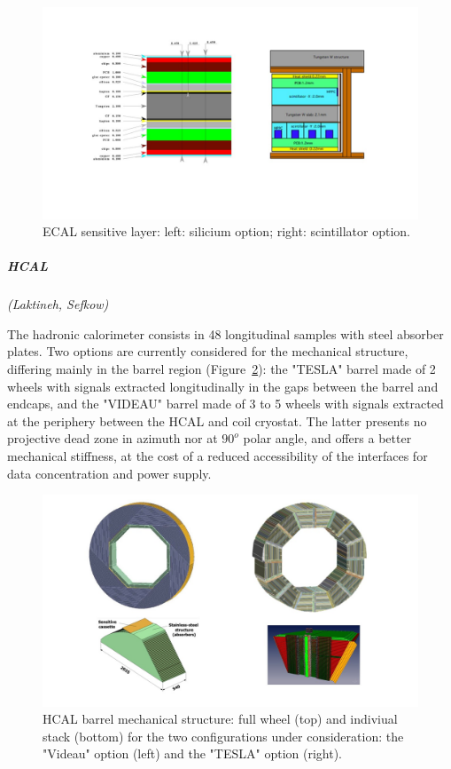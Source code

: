 \begin{figure}[t!]
\centering
\includegraphics[width=1.0\hsize]{Detector/fig/ECAL_readout.jpg}
\caption{ECAL sensitive layer: left: silicium option; right: scintillator option.}
\label{fig:det:ECAL_readout}
\end{figure}


\vspace{1cm}
\subparagraph*{\bf HCAL}
\textit{(Laktineh, Sefkow)}

The hadronic calorimeter consists in 48 longitudinal samples with steel absorber plates. Two options are currently considered for the mechanical structure, differing mainly in the barrel region (Figure~\ref{fig:det:HCAL}): the "TESLA" barrel made of 2 wheels with signals extracted longitudinally in the gaps between the barrel and endcaps, and the "VIDEAU" barrel made of 3 to 5 wheels with signals extracted at the periphery between the HCAL and coil cryostat. The latter presents no projective dead zone in azimuth nor at $90^o$ polar angle, and offers a better mechanical stiffness, at the cost of a reduced accessibility of the interfaces for data concentration and power supply.

\begin{figure}[t!]
\centering
\includegraphics[width=1.1\hsize]{Detector/fig/HCAL_structure.jpg}
\caption{HCAL barrel mechanical structure: full wheel (top) and indiviual stack (bottom) for the two configurations under consideration: the "Videau" option (left) and the "TESLA" option (right).}
\label{fig:det:HCAL}
\end{figure}

